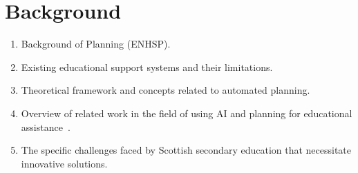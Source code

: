 \section{Background}
\begin{enumerate}
    \item Background of Planning (ENHSP).
    \item Existing educational support systems and their limitations.
    \item Theoretical framework and concepts related to automated planning.
    \item Overview of related work in the field of using AI and planning for educational assistance~\cite{Castillo2009}.
    \item The specific challenges faced by Scottish secondary education that necessitate innovative solutions.
\end{enumerate}
